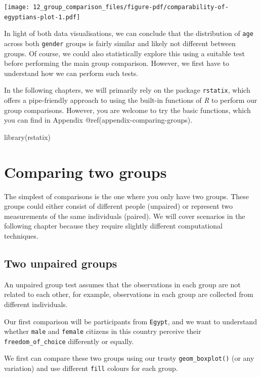\documentclass[
  letterpaper,
]{krantz}
\makeatletter
\newenvironment{Shaded}{\begin{snugshade}}{\end{snugshade}}
\newcommand{\FunctionTok}[1]{\textcolor[rgb]{0.28,0.35,0.67}{#1}}
\newcommand{\NormalTok}[1]{\textcolor[rgb]{0.00,0.23,0.31}{#1}}
\newenvironment{kframe}{%
\medskip{}
\setlength{\fboxsep}{.8em}
 \def\at@end@of@kframe{}%
 \ifinner\ifhmode%
  \def\at@end@of@kframe{\end{minipage}}%
  \begin{minipage}{\columnwidth}%
 \fi\fi%
 \def\FrameCommand##1{\hskip\@totalleftmargin \hskip-\fboxsep
 \colorbox{shadecolor}{##1}\hskip-\fboxsep
     \hskip-\linewidth \hskip-\@totalleftmargin \hskip\columnwidth}%
 \MakeFramed {\advance\hsize-\width
   \@totalleftmargin\z@ \linewidth\hsize
   \@setminipage}}%
 {\par\unskip\endMakeFramed%
 \at@end@of@kframe}
\renewenvironment{Shaded}{\begin{kframe}}{\end{kframe}}
\makeatother
\begin{document}
\texttt{[image: 12\_group\_comparison\_files/figure-pdf/comparability-of-egyptians-plot-1.pdf]}

In light of both data visualisations, we can conclude that the
distribution of \texttt{age} across both \texttt{gender} groups is
fairly similar and likely not different between groups. Of course, we
could also statistically explore this using a suitable test before
performing the main group comparison. However, we first have to
understand how we can perform such tests.

In the following chapters, we will primarily rely on the package
\texttt{rstatix}, which offers a pipe-friendly approach to using the
built-in functions of \emph{R} to perform our group comparisons.
However, you are welcome to try the basic functions, which you can find
in Appendix @ref(appendix-comparing-groups).

\begin{Shaded}
\begin{Highlighting}[]
\FunctionTok{library}\NormalTok{(rstatix)}
\end{Highlighting}
\end{Shaded}

\section{Comparing two groups}\label{sec-comparing-two-groups}

The simplest of comparisons is the one where you only have two groups.
These groups could either consist of different people (unpaired) or
represent two measurements of the same individuals (paired). We will
cover scenarios in the following chapter because they require slightly
different computational techniques.

\subsection{Two unpaired groups}\label{sec-two-unpaired-groups}

An unpaired group test assumes that the observations in each group are
not related to each other, for example, observations in each group are
collected from different individuals.

Our first comparison will be participants from \texttt{Egypt}, and we
want to understand whether \texttt{male} and \texttt{female} citizens in
this country perceive their \texttt{freedom\_of\_choice} differently or
equally.

We first can compare these two groups using our trusty
\texttt{geom\_boxplot()} (or any variation) and use different
\texttt{fill} colours for each group.
\end{document}
